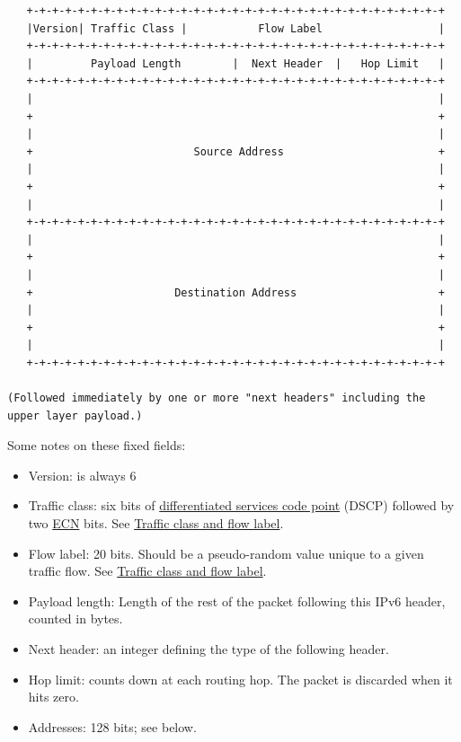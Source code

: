 \documentclass[
]{article}
\begin{document}
\begin{verbatim}
   +-+-+-+-+-+-+-+-+-+-+-+-+-+-+-+-+-+-+-+-+-+-+-+-+-+-+-+-+-+-+-+-+
   |Version| Traffic Class |           Flow Label                  |
   +-+-+-+-+-+-+-+-+-+-+-+-+-+-+-+-+-+-+-+-+-+-+-+-+-+-+-+-+-+-+-+-+
   |         Payload Length        |  Next Header  |   Hop Limit   |
   +-+-+-+-+-+-+-+-+-+-+-+-+-+-+-+-+-+-+-+-+-+-+-+-+-+-+-+-+-+-+-+-+
   |                                                               |
   +                                                               +
   |                                                               |
   +                         Source Address                        +
   |                                                               |
   +                                                               +
   |                                                               |
   +-+-+-+-+-+-+-+-+-+-+-+-+-+-+-+-+-+-+-+-+-+-+-+-+-+-+-+-+-+-+-+-+
   |                                                               |
   +                                                               +
   |                                                               |
   +                      Destination Address                      +
   |                                                               |
   +                                                               +
   |                                                               |
   +-+-+-+-+-+-+-+-+-+-+-+-+-+-+-+-+-+-+-+-+-+-+-+-+-+-+-+-+-+-+-+-+

(Followed immediately by one or more "next headers" including the
upper layer payload.)
\end{verbatim}

Some notes on these fixed fields:

\begin{itemize}
\item
  Version: is always 6
\item
  Traffic class: six bits of
  \href{https://www.rfc-editor.org/info/rfc2474}{differentiated services
  code point} (DSCP) followed by two
  \href{https://www.rfc-editor.org/info/rfc3168}{ECN} bits. See
  \hyperref[traffic-class-and-flow-label]{Traffic class and flow label}.
\item
  Flow label: 20 bits. Should be a pseudo-random value unique to a given
  traffic flow. See \hyperref[traffic-class-and-flow-label]{Traffic
  class and flow label}.
\item
  Payload length: Length of the rest of the packet following this IPv6
  header, counted in bytes.
\item
  Next header: an integer defining the type of the following header.
\item
  Hop limit: counts down at each routing hop. The packet is discarded
  when it hits zero.
\item
  Addresses: 128 bits; see below.
\end{itemize}
\end{document}
